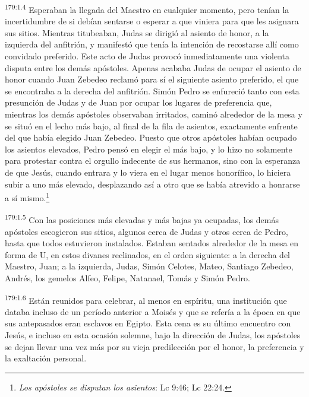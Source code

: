 \par
\textsuperscript{179:1.4} Esperaban la llegada del Maestro en cualquier momento, pero tenían la incertidumbre de si debían sentarse o esperar a que viniera para que les asignara sus sitios. Mientras titubeaban, Judas se dirigió al asiento de honor, a la izquierda del anfitrión, y manifestó que tenía la intención de recostarse allí como convidado preferido. Este acto de Judas provocó inmediatamente una violenta disputa entre los demás apóstoles. Apenas acababa Judas de ocupar el asiento de honor cuando Juan Zebedeo reclamó para sí el siguiente asiento preferido, el que se encontraba a la derecha del anfitrión. Simón Pedro se enfureció tanto con esta presunción de Judas y de Juan por ocupar los lugares de preferencia que, mientras los demás apóstoles observaban irritados, caminó alrededor de la mesa y se situó en el lecho más bajo, al final de la fila de asientos, exactamente enfrente del que había elegido Juan Zebedeo. Puesto que otros apóstoles habían ocupado los asientos elevados, Pedro pensó en elegir el más bajo, y lo hizo no solamente para protestar contra el orgullo indecente de sus hermanos, sino con la esperanza de que Jesús, cuando entrara y lo viera en el lugar menos honorífico, lo hiciera subir a uno más elevado, desplazando así a otro que se había atrevido a honrarse a sí mismo.\footnote{\textit{Los apóstoles se disputan los asientos}: Lc 9:46; Lc 22:24.}

\par
\textsuperscript{179:1.5} Con las posiciones más elevadas y más bajas ya ocupadas, los demás apóstoles escogieron sus sitios, algunos cerca de Judas y otros cerca de Pedro, hasta que todos estuvieron instalados. Estaban sentados alrededor de la mesa en forma de U, en estos divanes reclinados, en el orden siguiente: a la derecha del Maestro, Juan; a la izquierda, Judas, Simón Celotes, Mateo, Santiago Zebedeo, Andrés, los gemelos Alfeo, Felipe, Natanael, Tomás y Simón Pedro.

\par
\textsuperscript{179:1.6} Están reunidos para celebrar, al menos en espíritu, una institución que databa incluso de un período anterior a Moisés y que se refería a la época en que sus antepasados eran esclavos en Egipto. Esta cena es su último encuentro con Jesús, e incluso en esta ocasión solemne, bajo la dirección de Judas, los apóstoles se dejan llevar una vez más por su vieja predilección por el honor, la preferencia y la exaltación personal.

